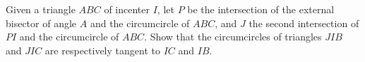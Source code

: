 Given a triangle $ ABC$ of incenter $ I$,  let $ P$ be the intersection of the external bisector of angle $ A$ and the circumcircle of $ ABC$,  and $ J$ the second intersection of $ PI$ and the circumcircle of $ ABC$. Show that the circumcircles of triangles $ JIB$ and $ JIC$ are respectively tangent to $ IC$ and $ IB$.